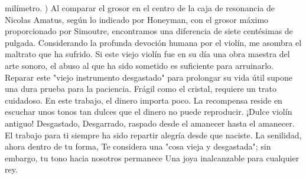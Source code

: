milímetro. )
Al comparar el grosor en el centro de la caja de resonancia de Nicolas Amatus, según lo indicado por Honeyman, con el grosor máximo proporcionado por Simoutre, encontramos una diferencia de siete centésimas de pulgada.
Considerando la profunda devoción humana por el violín, me asombra el maltrato que ha sufrido. Si este viejo violín fue en su día una obra maestra del arte sonoro, el abuso al que ha sido sometido es suficiente para arruinarlo. Reparar este "viejo instrumento desgastado" para prolongar su vida útil supone una dura prueba para la paciencia. Frágil como el cristal, requiere un trato cuidadoso. En este trabajo, el dinero importa poco. La recompensa reside en escuchar unos tonos tan dulces que el dinero no puede reproducir.
¡Dulce violín antiguo! Desgastado,
Desgarrado, raspado desde el amanecer hasta el amanecer. El trabajo para ti siempre ha sido repartir alegría desde que naciste. La senilidad, ahora dentro de tu forma,
Te considera una "cosa vieja y desgastada"; sin embargo, tu tono hacia nosotros permanece
Una joya inalcanzable para cualquier rey.

